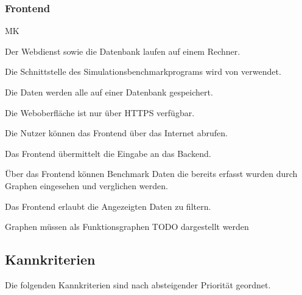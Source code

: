 \subsubsection{Frontend}
\begin{Kriterien}{MK}

    
	\item Der Webdienst sowie die Datenbank laufen auf einem Rechner.

	\item Die Schnittstelle des \gls{Simulationsbenchmarkprograms} wird von \name verwendet.

	\item Die Daten werden alle auf einer \gls{Datenbank} gespeichert.

	\item Die Weboberfläche ist nur über \gls{HTTPS} verfügbar.

	\item Die Nutzer können das \gls{Frontend} über das Internet abrufen.

	\item Das Frontend übermittelt die Eingabe an das Backend.

	\item Über das Frontend können Benchmark Daten die bereits erfasst wurden durch Graphen eingesehen und verglichen werden.

	\item Das Frontend erlaubt die Angezeigten Daten zu filtern.
 
    \item Graphen müssen als Funktionsgraphen TODO dargestellt werden 

\end{Kriterien}


\newpage
\subsection{Kannkriterien}
\setcounter{counter}{10}
Die folgenden Kannkriterien sind nach absteigender Priorität geordnet.
